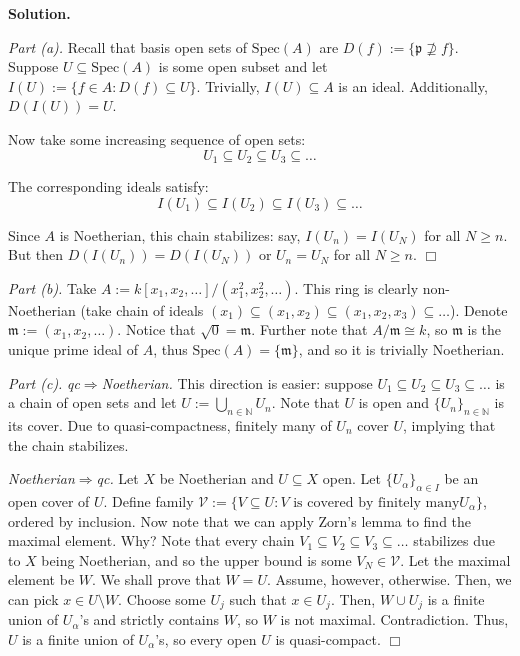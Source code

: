 \documentclass{template}
\newcommand{\qedwhite}{\hfill \ensuremath{\Box}}
\begin{document}
\textbf{Solution.}

\textit{Part (a).} Recall that basis open sets of $\text{Spec}(A)$ are $D(f) :=
\{\mathfrak{p} \not\supseteq f\}$. Suppose $U \subseteq \text{Spec}(A)$ is some
open subset and let $I(U) := \{f \in A: D(f) \subseteq U\}$. Trivially, $I(U)
\subseteq A$ is an ideal. Additionally, $D(I(U)) = U$.

Now take some increasing sequence of open sets:
\begin{equation*}
    U_1 \subseteq U_2 \subseteq U_3 \subseteq \dots
\end{equation*}

The corresponding ideals satisfy:
\begin{equation*}
    I(U_1) \subseteq I(U_2) \subseteq I(U_3) \subseteq \dots
\end{equation*}

Since $A$ is Noetherian, this chain stabilizes: say, $I(U_n) = I(U_N)$ for all
$N \geq n$. But then $D(I(U_n)) = D(I(U_N))$ or $U_n=U_N$ for all $N \geq n$. \qedwhite

\textit{Part (b).} Take $A := k[x_1,x_2,\dots] / (x_1^2, x_2^2, \dots)$. This
ring is clearly non-Noetherian (take chain of ideals $(x_1) \subseteq (x_1,x_2)
\subseteq (x_1,x_2,x_3) \subseteq \dots$). Denote $\mathfrak{m} :=
(x_1,x_2,\dots)$. Notice that $\sqrt{0} = \mathfrak{m}$. Further note that
$A/\mathfrak{m} \cong k$, so $\mathfrak{m}$ is the unique prime ideal of $A$,
thus $\text{Spec}(A) = \{\mathfrak{m}\}$, and so it is trivially Noetherian.

\textit{Part (c).} \textit{qc$\Rightarrow$Noetherian.} This direction is easier:
suppose $U_1 \subseteq U_2 \subseteq U_3 \subseteq \dots$ is a chain of open
sets and let $U := \bigcup_{n \in \mathbb{N}}U_n$. Note that $U$ is open and
$\{U_n\}_{n \in \mathbb{N}}$ is its cover. Due to quasi-compactness, finitely 
many of $U_n$ cover $U$, implying that the chain stabilizes.

\textit{Noetherian$\Rightarrow$qc.} Let $X$ be Noetherian and $U \subseteq X$
open. Let $\{U_{\alpha}\}_{\alpha \in I}$ be an open cover of $U$. Define family
$\mathcal{V} := \{V \subseteq U: \text{$V$ is covered by finitely many
$U_{\alpha}$}\}$, ordered by inclusion. Now note that we can apply Zorn's lemma
to find the maximal element. Why? Note that every chain $V_1 \subseteq V_2
\subseteq V_3 \subseteq \dots$ stabilizes due to $X$ being Noetherian, and so
the upper bound is some $V_N \in \mathcal{V}$. Let the maximal element be $W$.
We shall prove that $W = U$. Assume, however, otherwise. Then, we can pick $x
\in U \setminus W$. Choose some $U_j$ such that $x \in U_j$. Then, $W \cup U_j$
is a finite union of $U_{\alpha}$'s and strictly contains $W$, so $W$ is not
maximal. Contradiction. Thus, $U$ is a finite union of $U_{\alpha}$'s, so every
open $U$ is quasi-compact. \qedwhite
\end{document}
